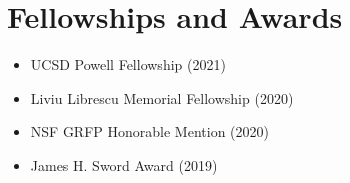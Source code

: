 \documentclass[letterpaper,11pt]{article}
\begin{document}
\section{Fellowships and Awards}
\vspace*{-0.4cm}
\begin{multicols}{2}
  \begin{itemize}[leftmargin=*, noitemsep]
    \item UCSD Powell Fellowship (2021)
    \item Liviu Librescu Memorial Fellowship (2020)
    \item NSF GRFP Honorable Mention (2020)
    \item James H. Sword Award (2019)
  \end{itemize}
\end{multicols}




\end{document}
